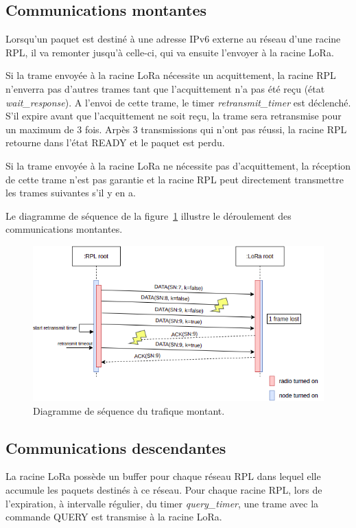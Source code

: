 \subsection*{Communications montantes}%
    Lorsqu'un paquet est destiné à une adresse IPv6 externe au réseau d'une racine RPL, il va remonter jusqu'à celle-ci, qui va ensuite l'envoyer à la racine LoRa.

    Si la trame envoyée à la racine LoRa nécessite un acquittement, la racine RPL n'enverra pas d'autres trames tant que l'acquittement n'a pas été reçu (état \textit{wait\_response}).
    A l'envoi de cette trame, le timer \textit{retransmit\_timer} est déclenché. S'il expire avant que l'acquittement ne soit reçu, la trame sera retransmise pour un maximum de 3 fois.
    Arpès 3 transmissions qui n'ont pas réussi, la racine RPL retourne dans l'état READY et le paquet est perdu.

    Si la trame envoyée à la racine LoRa ne nécessite pas d'acquittement, la réception de cette trame n'est pas garantie et la racine RPL peut directement transmettre les trames suivantes s'il y en a.

    Le diagramme de séquence de la figure~\ref{fig:proto-seq-upward} illustre le déroulement des communications montantes.
    \begin{figure}[H]
        \centering
        \includegraphics[scale=0.6]{res/pictures/loramac-sequence-UPWARD.drawio.png}
        \caption{Diagramme de séquence du trafique montant.}
        \label{fig:proto-seq-upward}
    \end{figure}    

\subsection*{Communications descendantes}%
    La racine LoRa possède un buffer pour chaque réseau RPL dans lequel elle accumule les paquets destinés à ce réseau. Pour chaque racine RPL, lors de l'expiration, à intervalle régulier, du timer \textit{query\_timer}, une trame avec la commande QUERY est transmise à la racine LoRa.

